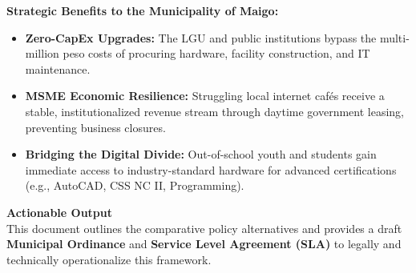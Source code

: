 \vspace{1em}
\noindent \textbf{Strategic Benefits to the Municipality of Maigo:}
\begin{itemize}
    \item \textbf{Zero-CapEx Upgrades:} The LGU and public institutions bypass the multi-million peso costs of procuring hardware, facility construction, and IT maintenance.
    \item \textbf{MSME Economic Resilience:} Struggling local internet cafés receive a stable, institutionalized revenue stream through daytime government leasing, preventing business closures.
    \item \textbf{Bridging the Digital Divide:} Out-of-school youth and students gain immediate access to industry-standard hardware for advanced certifications (e.g., AutoCAD, CSS NC II, Programming).
\end{itemize}

\vspace{1em}
\noindent \textbf{Actionable Output} \\
This document outlines the comparative policy alternatives and provides a draft \textbf{Municipal Ordinance} and \textbf{Service Level Agreement (SLA)} to legally and technically operationalize this framework.